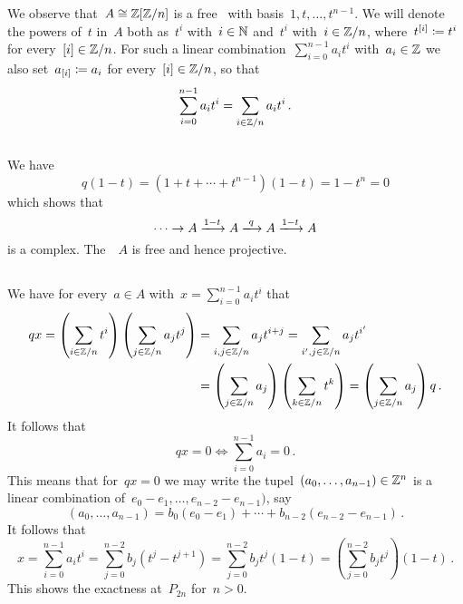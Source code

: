 \section{}


We observe that~$A \cong \mathbb{Z}[\mathbb{Z}/n]$ is a free~ with basis~$1, t, \dotsc, t^{n-1}$.
We will denote the powers of~$t$ in~$A$ both as~$t^i$ with~$i \in \mathbb{N}$ and~$t^i$ with~$i \in \mathbb{Z}/n$, where~$t^{[i]} \coloneqq t^i$ for every~$[i] \in \mathbb{Z}/n$.
For such a linear combination~$\sum_{i=0}^{n-1} a_i t^i$ with~$a_i \in \mathbb{Z}$ we also set~$a_{[i]} \coloneqq a_i$ for every~$[i] \in \mathbb{Z}/n$, so that
\[
  \sum_{i=0}^{n-1} a_i t^i
  =
  \sum_{i \in \mathbb{Z}/n} a_i t^i \,.
\]





\subsection{}

We have
\[
  q (1-t)
  =
  (1 + t + \dotsb + t^{n-1}) (1-t)
  =
  1 - t^n
  =
  0
\]
which shows that
\[
  \dotsb
  \to
  A
  \xlongto{1-t}
  A
  \xlongto{q}
  A
  \xlongto{1-t}
  A
\]
is a complex.
The~{}~$A$ is free and hence projective.





\subsection{}

We have for every~$a \in A$ with~$x = \sum_{i=0}^{n-1} a_i t^i$ that
\begin{align*}
  qx
  =
  \left( \sum_{i \in \mathbb{Z}/n} t^i \right)
  \left( \sum_{j \in \mathbb{Z}/n} a_j t^j \right)
  &=
  \sum_{i,j \in \mathbb{Z}/n} a_j t^{i+j}
  =
  \sum_{i',j \in \mathbb{Z}/n} a_j t^{i'}
  \\
  &=
  \left( \sum_{ j \in \mathbb{Z}/n } a_j \right)
  \left( \sum_{ k \in \mathbb{Z}/n } t^k \right)
  =
  \left( \sum_{ j \in \mathbb{Z}/n } a_j \right)
  q \,.
\end{align*}
It follows that
\[
  qx = 0
  \iff
  \sum_{i=0}^{n-1} a_i = 0 \,.
\]
This means that for~$qx = 0$ we may write the tupel~$(a_0, \dotsc, a_{n-1}) \in \mathbb{Z}^n$ is a linear combination of~$e_0 - e_1, \dotsc, e_{n-2} - e_{n-1})$, say
\[
  (a_0, \dotsc, a_{n-1})
  =
  b_0 (e_0 - e_1) + \dotsb + b_{n-2} (e_{n-2} - e_{n-1}) \,.
\]
It follows that
\[
  x
  =
  \sum_{i=0}^{n-1} a_i t^i
  =
  \sum_{j=0}^{n-2} b_j (t^j - t^{j+1})
  =
  \sum_{j=0}^{n-2} b_j t^j (1-t)
  =
  \left( \sum_{j=0}^{n-2} b_j t^j \right) (1 - t) \,.
\]
This shows the exactness at~$P_{2n}$ for~$n > 0$.

